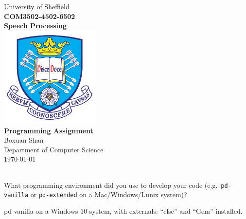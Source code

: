 \documentclass[hidelinks,a4paper,11pt]{article}
\begin{document}
\begin{titlepage}

\begin{center}
{\LARGE University of Sheffield}\\[1cm]
\huge {\bfseries COM3502-4502-6502\\Speech Processing}\\[1cm]
\includegraphics[width=5cm]{tuoslogo.png}\\[1cm]
{\huge \bfseries Programming Assignment}\\[0.5cm]

{\Large Boxuan Shan}\\[1cm]

{\LARGE Department of Computer Science}\\
{\Large \today}
\end{center}

\end{titlepage}

{\color{red}{\bfseries QUESTION 0}\\What programming environment did you use to develop your code (e.g.\ \texttt{pd-vanilla} or \texttt{pd-extended} on a Mac/Windows/Lunix system)?}
\\
\begin{mdframed}
  pd-vanilla on a Windows 10 system, with externals: ``else'' and ``Gem'' installed.
\end{mdframed}
\vspace*{\baselineskip}
\end{document}
